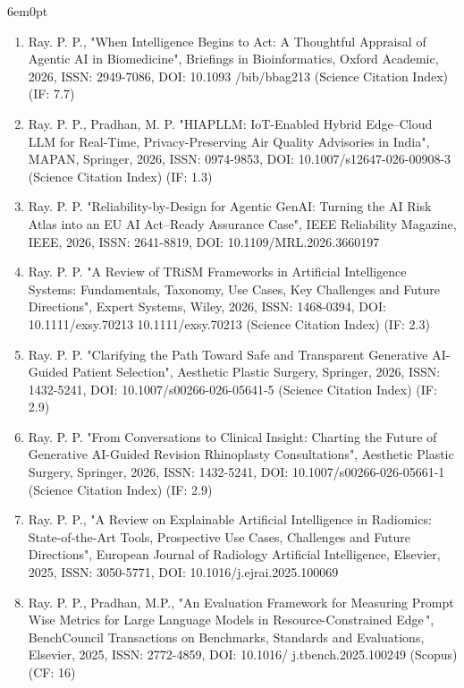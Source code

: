 \documentclass[11pt,a4paper]{moderncv}
\begin{document}
\begin{adjustwidth}{6em}{0pt}
\begin{enumerate}
		\item 	Ray. P. P., "When Intelligence Begins to Act: A Thoughtful Appraisal of Agentic AI in Biomedicine", Briefings in Bioinformatics, Oxford Academic, 2026, ISSN: 2949-7086, DOI: 10.1093 /bib/bbag213 (Science Citation Index) (IF: 7.7)
		
		\item 	Ray. P. P., Pradhan, M. P. "HIAPLLM: IoT-Enabled Hybrid Edge–Cloud LLM for Real-Time, Privacy-Preserving Air Quality Advisories in India", MAPAN, Springer, 2026, ISSN: 0974-9853, DOI: 10.1007/s12647-026-00908-3 (Science Citation Index) (IF: 1.3) 
		
		\item 	Ray. P. P. "Reliability-by-Design for Agentic GenAI: Turning the AI Risk Atlas into an EU AI Act–Ready Assurance Case", IEEE Reliability Magazine, IEEE, 2026, ISSN: 2641-8819, DOI: 10.1109/MRL.2026.3660197
		
		
		\item Ray. P. P. "A Review of TRiSM Frameworks in Artificial Intelligence Systems: Fundamentals, Taxonomy, Use Cases, Key Challenges and Future Directions", Expert Systems, Wiley, 2026, ISSN: 1468-0394, DOI: 10.1111/exsy.70213 10.1111/exsy.70213 (Science Citation Index) (IF: 2.3) 
		
		\item Ray. P. P. "Clarifying the Path Toward Safe and Transparent Generative AI-Guided Patient Selection", Aesthetic Plastic Surgery, Springer, 2026, ISSN: 1432-5241, DOI: 10.1007/s00266-026-05641-5 (Science Citation Index) (IF: 2.9) 
		
		\item Ray. P. P. "From Conversations to Clinical Insight: Charting the Future of Generative AI-Guided Revision Rhinoplasty Consultations", Aesthetic Plastic Surgery, Springer, 2026, ISSN: 1432-5241, DOI: 10.1007/s00266-026-05661-1 (Science Citation Index) (IF: 2.9) 
		
		
		\item Ray. P. P., "A Review on Explainable Artificial Intelligence in Radiomics: State-of-the-Art Tools, Prospective Use Cases, Challenges and Future Directions", European Journal of Radiology Artificial Intelligence, Elsevier, 2025, ISSN: 3050-5771, DOI: 10.1016/j.ejrai.2025.100069 
		
		\item Ray. P. P., Pradhan, M.P., "An Evaluation Framework for Measuring Prompt Wise Metrics for Large Language Models in Resource-Constrained Edge ", BenchCouncil Transactions on Benchmarks, Standards and Evaluations, Elsevier, 2025, ISSN: 2772-4859, DOI: 10.1016/ j.tbench.2025.100249 (Scopus) (CF: 16) 
		

\end{enumerate}
\end{adjustwidth}
\end{document}
